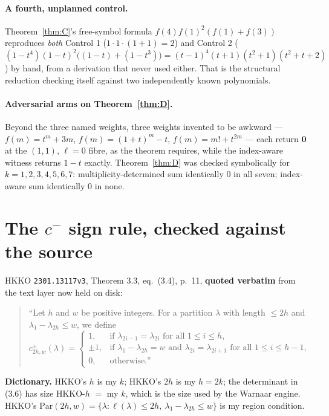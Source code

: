 \documentclass[11pt]{article}
\theoremstyle{plain}
\theoremstyle{definition}
\theoremstyle{remark}
\newcommand{\cm}{c^{-}}
\begin{document}
\paragraph{A fourth, unplanned control.} Theorem~\ref{thm:C}'s free-symbol formula
$f(4)f(1)^2(f(1)+f(3))$ reproduces \emph{both} Control 1 ($1\cdot1\cdot(1+1)=2$) and
Control 2 ($(1-t^4)(1-t)^2\bigl((1-t)+(1-t^3)\bigr)=(t-1)^4(t+1)(t^2+1)(t^2+t+2)$)
by hand, from a derivation that never used either. That is the structural reduction
checking itself against two independently known polynomials.

\paragraph{Adversarial arms on Theorem~\ref{thm:D}.} Beyond the three named weights, three
weights invented to be awkward --- $f(m)=t^m+3m$, $f(m)=(1+t)^m-t$, $f(m)=m!+t^{2m}$ ---
each return $\mathbf{0}$ at the $(1,1)$, $\ell=0$ fibre, as the theorem requires, while the
index-aware witness returns $1-t$ exactly. Theorem~\ref{thm:D} was checked symbolically for
$k=1,2,3,4,5,6,7$: multiplicity-determined sum identically $0$ in all seven; index-aware
sum identically $0$ in none.

\section{The \texorpdfstring{$\cm$}{c-} sign rule, checked against the source}\label{sec:hkko}

HKKO \texttt{2301.13117v3}, Theorem 3.3, eq.\ (3.4), p.\ 11, \textbf{quoted verbatim} from
the text layer now held on disk:

\begin{quote}\small
``Let $h$ and $w$ be positive integers. For a partition $\lambda$ with length $\leq 2h$ and
$\lambda_1-\lambda_{2h}\leq w$, we define
\[
c^{\pm}_{2h,w}(\lambda)=\begin{cases}
1, & \text{if }\lambda_{2i-1}=\lambda_{2i}\text{ for all }1\leq i\leq h,\\
\pm1, & \text{if }\lambda_1-\lambda_{2h}=w\text{ and }\lambda_{2i}=\lambda_{2i+1}\text{ for all }1\leq i\leq h-1,\\
0, & \text{otherwise.''}
\end{cases}
\]
\end{quote}

\noindent\textbf{Dictionary.} HKKO's $h$ is my $k$; HKKO's $2h$ is my $h=2k$; the
determinant in (3.6) has size HKKO-$h$ $=$ my $k$, which is the size used by the Warnaar
engine. HKKO's $\mathrm{Par}(2h,w)=\{\lambda:\ell(\lambda)\leq 2h,\ \lambda_1-\lambda_{2h}\leq w\}$
is my region condition.
\end{document}
